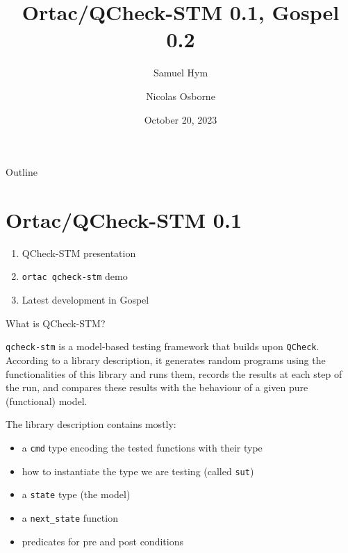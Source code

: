\documentclass[pdf]{beamer}
\title{Ortac/QCheck-STM 0.1, Gospel 0.2}
\author{
  Samuel Hym
  \and
  Nicolas Osborne
}
\date{October 20, 2023}
\begin{document}
\begin{frame}
  \titlepage
\end{frame}

\begin{frame}{Outline}
    \tableofcontents[hideallsubsections]
\end{frame}


\section{Ortac/QCheck-STM 0.1}

\begin{frame}

  \begin{enumerate}
    \item QCheck-STM presentation
    \item \texttt{ortac qcheck-stm} demo
    \item Latest development in Gospel
  \end{enumerate}

\end{frame}

\begin{frame}{What is QCheck-STM?}

  \texttt{qcheck-stm} is a model-based testing framework that builds upon
  \texttt{QCheck}. According to a library description, it generates random
  programs using the functionalities of this library and runs them, records
  the results at each step of the run, and compares these results with the
  behaviour of a given pure (functional) model.

\end{frame}

\begin{frame}

  The library description contains mostly:

  \begin{itemize}

    \item a \texttt{cmd} type encoding the tested functions with their type
    \item how to instantiate the type we are testing (called \texttt{sut})
    \item a \texttt{state} type (the model)
    \item a \texttt{next\_state} function
    \item predicates for pre and post conditions

  \end{itemize}

\end{frame}
\end{document}
